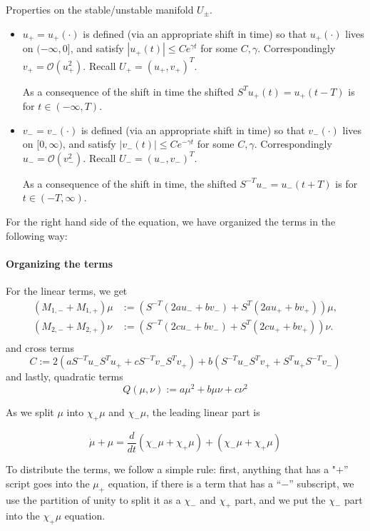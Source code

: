 \documentclass[letterpaper,11pt]{article}
\newcommand{\rmO}{\mathcal{O}}
\numberwithin{equation}{section}
\theoremstyle{plain}
\begin{document}
Properties on the stable/unstable manifold $U_\pm$.
\begin{itemize}
\item $u_+=u_+(\cdot)$ is defined (via an appropriate shift in time) so that $u_+(\cdot)$ lives on $(-\infty,0]$, and satisfy $|u_+(t)|\le C e^{\gamma t}$ for some $C,\gamma$. Correspondingly $v_+ =  \rmO(u_+^2)$. Recall $U_+ =(u_+,v_+)^T$.

As a consequence of the shift in time
the shifted $S^Tu_+(t)=u_+(t-T)$ is for $t \in (-\infty, T)$.

\item $v_-=v_-(\cdot)$ is defined (via an appropriate shift in time) so that $v_-(\cdot)$ lives on $[0,\infty)$, and satisfy $|v_-(t)|\le C e^{-\gamma t}$ for some $C,\gamma$. Correspondingly $u_- = \rmO(v_-^2)$. Recall $U_- =(u_-,v_-)^T$.

As a consequence of the shift in time, the shifted $S^{-T}u_-
=u_-(t+T)$ is  for $t \in (-T, \infty)$.
\end{itemize}
\pagebreak



For the right hand side of the equation, we have organized the terms in the following way:

\paragraph{Organizing the terms}
For the linear terms, we get 
\begin{align*}
(M_{1,-}+M_{1,+})\mu &:= (S^{-T}(2au_-+bv_-)+S^T(2au_++bv_+))\mu, \\ 
(M_{2,-}+M_{2,+})\nu &:=(S^{-T}(2cu_-+bv_-)+S^T(2cu_++bv_+))\nu. \\
\end{align*}
and cross terms
\[
C:=2(aS^{-T}u_-S^Tu_++cS^{-T}v_-S^Tv_+)+b(S^{-T}u_-S^Tv_++S^Tu_+S^{-T}v_-)
\]
and lastly, quadratic terms
\[
Q(\mu,\nu):=a\mu^2+b\mu \nu+c\nu^2
\]


As we split $\mu$ into $\chi_+\mu$ and $\chi_-\mu$, the leading linear part is

\[
\dot{\mu}+\mu = \frac{d}{dt}(\chi_-\mu+\chi_+\mu)+(\chi_-\mu+\chi_+\mu)
\]

To distribute the terms, we follow a simple rule: first, anything that has a "$+$'' script goes into the $\mu_+$ equation, if there is a term  that has a ``$-$'' subscript, we use the partition of unity to split it as a $\chi_-$ and $\chi_+$ part, and we put the $\chi_-$ part into the $\chi_+\mu$ equation. 
\end{document}

